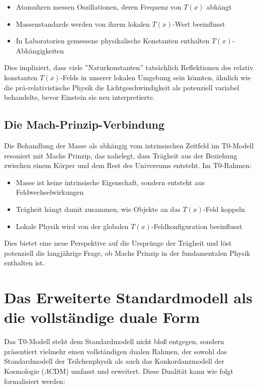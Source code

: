 \documentclass[12pt,a4paper]{article}
\newcommand{\Tfield}{T(x)}
\begin{document}
	\begin{itemize}
		\item Atomuhren messen Oszillationen, deren Frequenz von $\Tfield$ abhängt
		\item Massenstandards werden von ihrem lokalen $\Tfield$-Wert beeinflusst
		\item In Laboratorien gemessene physikalische Konstanten enthalten $\Tfield$-Abhängigkeiten
	\end{itemize}
	
	Dies impliziert, dass viele ''Naturkonstanten'' tatsächlich Reflektionen des relativ konstanten $\Tfield$-Felds in unserer lokalen Umgebung sein könnten, ähnlich wie die prä-relativistische Physik die Lichtgeschwindigkeit als potenziell variabel behandelte, bevor Einstein sie neu interpretierte.
	
	\subsection{Die Mach-Prinzip-Verbindung}
	
	Die Behandlung der Masse als abhängig vom intrinsischen Zeitfeld im T0-Modell resoniert mit Machs Prinzip, das nahelegt, dass Trägheit aus der Beziehung zwischen einem Körper und dem Rest des Universums entsteht. Im T0-Rahmen:
	
	\begin{itemize}
		\item Masse ist keine intrinsische Eigenschaft, sondern entsteht aus Feldwechselwirkungen
		\item Trägheit hängt damit zusammen, wie Objekte an das $\Tfield$-Feld koppeln
		\item Lokale Physik wird von der globalen $\Tfield$-Feldkonfiguration beeinflusst
	\end{itemize}
	
	Dies bietet eine neue Perspektive auf die Ursprünge der Trägheit und löst potenziell die langjährige Frage, ob Machs Prinzip in der fundamentalen Physik enthalten ist.
	
	\section{Das Erweiterte Standardmodell als die vollständige duale Form}
	
	Das T0-Modell steht dem Standardmodell nicht bloß entgegen, sondern präsentiert vielmehr einen vollständigen dualen Rahmen, der sowohl das Standardmodell der Teilchenphysik als auch das Konkordanzmodell der Kosmologie ($\Lambda$CDM) umfasst und erweitert. Diese Dualität kann wie folgt formalisiert werden:
	
\end{document}
